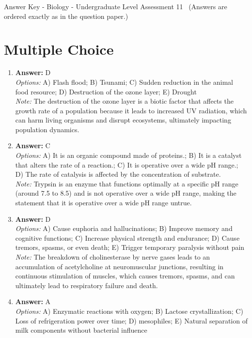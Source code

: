 \documentclass[12pt]{article}
\begin{document}
\begin{center}
Answer Key - Biology - Undergraduate Level Assessment 11 \
\small (Answers are ordered exactly as in the question paper.)
\end{center}

\section*{Multiple Choice}
\begin{enumerate}[label=\arabic*.]
\item \textbf{Answer:} D
\\ \textit{Options:} A) Flash flood; B) Tsunami; C) Sudden reduction in the animal food resource; D) Destruction of the ozone layer; E) Drought
\\ \textit{Note:} The destruction of the ozone layer is a biotic factor that affects the growth rate of a population because it leads to increased UV radiation, which can harm living organisms and disrupt ecosystems, ultimately impacting population dynamics.
\item \textbf{Answer:} C
\\ \textit{Options:} A) It is an organic compound made of proteins.; B) It is a catalyst that alters the rate of a reaction.; C) It is operative over a wide pH range.; D) The rate of catalysis is affected by the concentration of substrate.
\\ \textit{Note:} Trypsin is an enzyme that functions optimally at a specific pH range (around 7.5 to 8.5) and is not operative over a wide pH range, making the statement that it is operative over a wide pH range untrue.
\item \textbf{Answer:} D
\\ \textit{Options:} A) Cause euphoria and hallucinations; B) Improve memory and cognitive functions; C) Increase physical strength and endurance; D) Cause tremors, spasms, or even death; E) Trigger temporary paralysis without pain
\\ \textit{Note:} The breakdown of cholinesterase by nerve gases leads to an accumulation of acetylcholine at neuromuscular junctions, resulting in continuous stimulation of muscles, which causes tremors, spasms, and can ultimately lead to respiratory failure and death.
\item \textbf{Answer:} A
\\ \textit{Options:} A) Enzymatic reactions with oxygen; B) Lactose crystallization; C) Loss of refrigeration power over time; D) mesophiles; E) Natural separation of milk components without bacterial influence

\end{enumerate}
\end{document}
